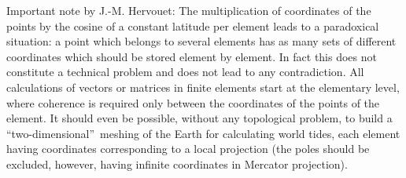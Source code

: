 \begin{CommentBlock}{Important note by J.-M. Hervouet:}
  The multiplication of coordinates of the points by the cosine of a
  constant latitude per element leads to a paradoxical situation: a point which
  belongs to several elements has as many sets of different coordinates which
  should be stored element by element. In fact this does not constitute a technical
  problem and does not lead to any contradiction. All calculations of vectors or
  matrices in finite elements start at the elementary level, where coherence is
  required only between the coordinates of the points of the element. It should
  even be possible, without any topological problem, to build a
  \textquotedblleft two-dimensional\textquotedblright\ meshing of the Earth for
  calculating world tides, each element having coordinates corresponding to a
  local projection (the poles should be excluded, however, having infinite coordinates
  in Mercator projection).
\end{CommentBlock}
